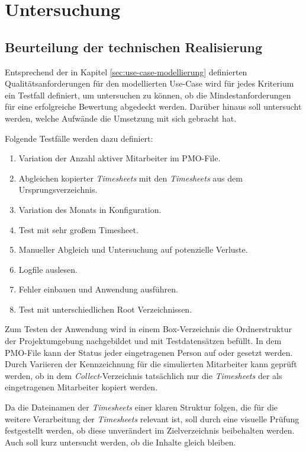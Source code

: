 \chapter{Untersuchung}

\section{Beurteilung der technischen Realisierung}
Entsprechend der in Kapitel \ref{sec:use-case-modellierung} definierten Qualitätsanforderungen für den modellierten Use-Case wird für jedes Kriterium ein Testfall definiert, um untersuchen zu können, ob die Mindestanforderungen für eine erfolgreiche Bewertung abgedeckt werden. Darüber hinaus soll untersucht werden, welche Aufwände die Umsetzung mit sich gebracht hat.

Folgende Testfälle werden dazu definiert:
\begin{enumerate}
    \item Variation der Anzahl aktiver Mitarbeiter im PMO-File.
    \item Abgleichen kopierter \textit{\glspl{Timesheet}} mit den \textit{\glspl{Timesheet}} aus dem Ursprungsverzeichnis.
    \item Variation des Monats in Konfiguration.
    \item Test mit sehr großem Timesheet.
    \item Manueller Abgleich und Untersuchung auf potenzielle Verluste.
    \item Logfile auslesen.
    \item Fehler einbauen und Anwendung ausführen.
    \item Test mit unterschiedlichen Root Verzeichnissen.
\end{enumerate}

Zum Testen der Anwendung wird in einem \gls{Box}-Verzeichnis die Ordnerstruktur der Projektumgebung nachgebildet und mit Testdatensätzen befüllt. In dem PMO-File kann der Status jeder eingetragenen Person auf \grqq{} oder \grqq{} gesetzt werden. Durch Variieren der Kennzeichnung für die simulierten Mitarbeiter kann geprüft werden, ob in dem \textit{Collect}-Verzeichnis tatsächlich nur die \textit{\glspl{Timesheet}} der als \grqq{} eingetragenen Mitarbeiter kopiert werden.

Da die Dateinamen der \textit{\glspl{Timesheet}} einer klaren Struktur folgen, die für die weitere Verarbeitung der \textit{\glspl{Timesheet}} relevant ist, soll durch eine visuelle Prüfung festgestellt werden, ob diese unverändert im Zielverzeichnis beibehalten werden. Auch soll kurz untersucht werden, ob die Inhalte gleich bleiben.

